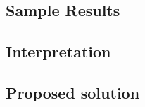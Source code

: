\subsection{Sample Results}
\par
\par
\subsection{Interpretation}
\par
\par
\subsection{Proposed solution}
\par
\par

